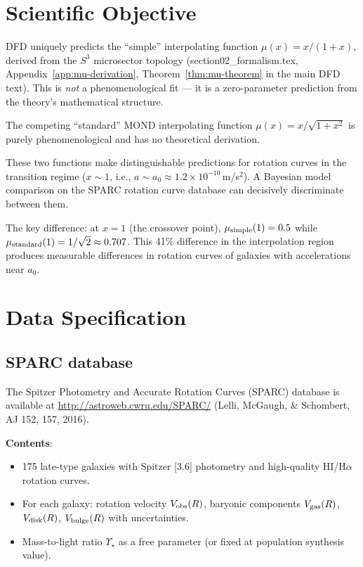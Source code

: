\documentclass[11pt]{article}
\newcommand{\ee}[1]{\times 10^{#1}}
\begin{document}
\section{Scientific Objective}

DFD uniquely predicts the ``simple'' interpolating function
$\mu(x) = x/(1+x)$, derived from the $S^3$ microsector topology
(section02\_formalism.tex, Appendix~\ref{app:mu-derivation},
Theorem~\ref{thm:mu-theorem} in the main DFD text). This is
\emph{not} a phenomenological fit --- it is a zero-parameter
prediction from the theory's mathematical structure.

The competing ``standard'' MOND interpolating function
$\mu(x) = x/\sqrt{1+x^2}$ is purely phenomenological and has no
theoretical derivation.

These two functions make distinguishable predictions for rotation
curves in the transition regime ($x \sim 1$, i.e.,
$a \sim a_0 \approx 1.2\ee{-10}$\,m/s$^2$). A Bayesian model
comparison on the SPARC rotation curve database can decisively
discriminate between them.

The key difference: at $x = 1$ (the crossover point),
$\mu_{\rm simple}(1) = 0.5$ while $\mu_{\rm standard}(1) = 1/\sqrt{2}
\approx 0.707$. This 41\% difference in the interpolation region
produces measurable differences in rotation curves of galaxies with
accelerations near $a_0$.

\section{Data Specification}

\subsection{SPARC database}

The Spitzer Photometry and Accurate Rotation Curves (SPARC) database
is available at \url{http://astroweb.cwru.edu/SPARC/}
(Lelli, McGaugh, \& Schombert, AJ 152, 157, 2016).

\textbf{Contents}:
\begin{itemize}[nosep]
\item 175 late-type galaxies with Spitzer [3.6] photometry and
  high-quality HI/H$\alpha$ rotation curves.
\item For each galaxy: rotation velocity $V_{\rm obs}(R)$, baryonic
  components $V_{\rm gas}(R)$, $V_{\rm disk}(R)$, $V_{\rm bulge}(R)$
  with uncertainties.
\item Mass-to-light ratio $\Upsilon_\star$ as a free parameter
  (or fixed at population synthesis value).
\end{itemize}
\end{document}
